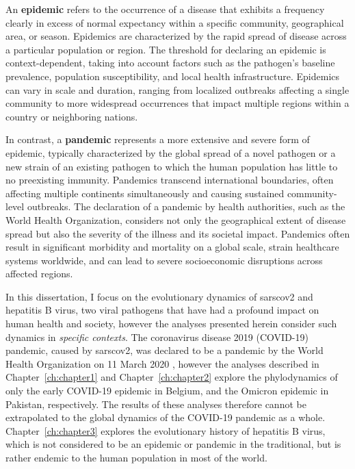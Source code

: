 An \textbf{epidemic} refers to the occurrence of a disease that exhibits a frequency clearly in excess of normal expectancy within a specific community, geographical area, or season.
Epidemics are characterized by the rapid spread of disease across a particular population or region.
The threshold for declaring an epidemic is context-dependent, taking into account factors such as the pathogen's baseline prevalence, population susceptibility, and local health infrastructure.
Epidemics can vary in scale and duration, ranging from localized outbreaks affecting a single community to more widespread occurrences that impact multiple regions within a country or neighboring nations.

In contrast, a \textbf{pandemic} represents a more extensive and severe form of epidemic, typically characterized by the global spread of a novel pathogen or a new strain of an existing pathogen to which the human population has little to no preexisting immunity.
Pandemics transcend international boundaries, often affecting multiple continents simultaneously and causing sustained community-level outbreaks.
The declaration of a pandemic by health authorities, such as the World Health Organization, considers not only the geographical extent of disease spread but also the severity of the illness and its societal impact.
Pandemics often result in significant morbidity and mortality on a global scale, strain healthcare systems worldwide, and can lead to severe socioeconomic disruptions across affected regions.

In this dissertation, I focus on the evolutionary dynamics of \gls{sarscov2} and hepatitis B virus, two viral pathogens that have had a profound impact on human health and society, however the analyses presented herein consider such dynamics in \textit{specific contexts}.
The coronavirus disease 2019 (COVID-19) pandemic, caused by \gls{sarscov2}, was declared to be a pandemic by the World Health Organization on 11 March 2020 \citep{healthorganization2020coronavirus}, however the analyses described in Chapter~\ref{ch:chapter1} and Chapter~\ref{ch:chapter2} explore the phylodynamics of only the early COVID-19 epidemic in Belgium, and the Omicron epidemic in Pakistan, respectively.
The results of these analyses therefore cannot be extrapolated to the global dynamics of the COVID-19 pandemic as a whole.
Chapter~\ref{ch:chapter3} explores the evolutionary history of hepatitis B virus, which is not considered to be an epidemic or pandemic in the traditional, but is rather endemic to the human population in most of the world.

